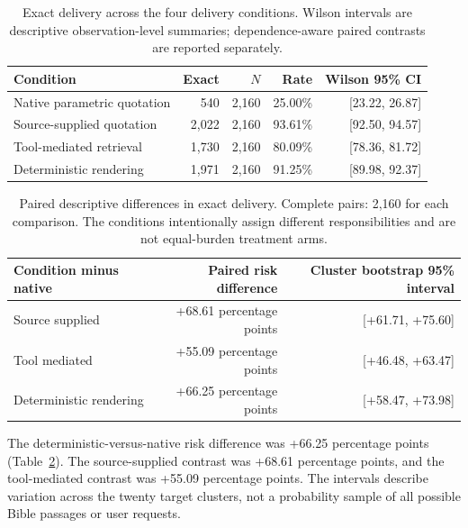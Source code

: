 \documentclass[11pt]{article}
\newcommand{\pp}{percentage points}
\begin{document}
\begin{table}[htbp]
\centering
\small
\begin{tabular}{lrrrr}
\toprule
Condition & Exact & $N$ & Rate & Wilson 95\% CI \\
\midrule
Native parametric quotation & 540 & 2,160 & 25.00\% & [23.22, 26.87] \\
Source-supplied quotation & 2,022 & 2,160 & 93.61\% & [92.50, 94.57] \\
Tool-mediated retrieval & 1,730 & 2,160 & 80.09\% & [78.36, 81.72] \\
Deterministic rendering & 1,971 & 2,160 & 91.25\% & [89.98, 92.37] \\
\bottomrule
\end{tabular}
\caption{Exact delivery across the four delivery conditions. Wilson
intervals are descriptive observation-level summaries; dependence-aware paired
contrasts are reported separately.}
\label{tab:primary}
\end{table}
\FloatBarrier

\begin{table}[htbp]
\centering
\small
\begin{tabular}{lrr}
\toprule
Condition minus native & Paired risk difference & Cluster bootstrap 95\% interval \\
\midrule
Source supplied & +68.61 \pp & [+61.71, +75.60] \\
Tool mediated & +55.09 \pp & [+46.48, +63.47] \\
Deterministic rendering & +66.25 \pp & [+58.47, +73.98] \\
\bottomrule
\end{tabular}
\caption{Paired descriptive differences in exact delivery. Complete pairs:
2,160 for each comparison. The conditions intentionally assign different
responsibilities and are not equal-burden treatment arms.}
\label{tab:effects}
\end{table}

The deterministic-versus-native risk difference was +66.25 \pp{}
(Table~\ref{tab:effects}). The source-supplied contrast was +68.61 \pp{}, and
the tool-mediated contrast was +55.09 \pp{}. The intervals describe
variation across the twenty target clusters, not a probability sample of all
possible Bible passages or user requests.
\end{document}
